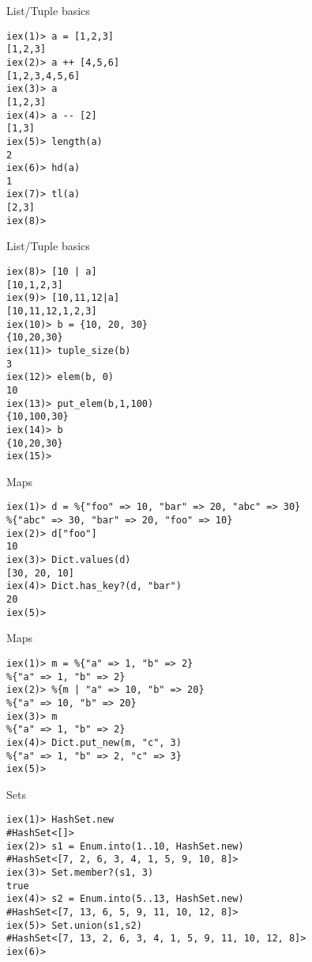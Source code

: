 \documentclass{beamer}
\begin{document}
\begin{frame}[fragile]{List/Tuple basics}

\begin{verbatim}
iex(1)> a = [1,2,3]
[1,2,3]
iex(2)> a ++ [4,5,6]
[1,2,3,4,5,6]
iex(3)> a
[1,2,3]
iex(4)> a -- [2]
[1,3]
iex(5)> length(a)
2
iex(6)> hd(a)
1
iex(7)> tl(a)
[2,3]
iex(8)>
\end{verbatim} 
\end{frame}

\begin{frame}[fragile]{List/Tuple basics}

\begin{verbatim}
iex(8)> [10 | a]
[10,1,2,3]
iex(9)> [10,11,12|a]
[10,11,12,1,2,3]
iex(10)> b = {10, 20, 30} 
{10,20,30}
iex(11)> tuple_size(b)
3
iex(12)> elem(b, 0)
10
iex(13)> put_elem(b,1,100)
{10,100,30}
iex(14)> b
{10,20,30}
iex(15)> 

\end{verbatim}
\end{frame}

\begin{frame}[fragile]{Maps}

\begin{verbatim}
iex(1)> d = %{"foo" => 10, "bar" => 20, "abc" => 30}
%{"abc" => 30, "bar" => 20, "foo" => 10}
iex(2)> d["foo"]
10
iex(3)> Dict.values(d)
[30, 20, 10]
iex(4)> Dict.has_key?(d, "bar")
20
iex(5)> 

\end{verbatim}
\end{frame}
\begin{frame}[fragile]{Maps}

\begin{verbatim}
iex(1)> m = %{"a" => 1, "b" => 2}
%{"a" => 1, "b" => 2}
iex(2)> %{m | "a" => 10, "b" => 20}
%{"a" => 10, "b" => 20}
iex(3)> m
%{"a" => 1, "b" => 2}
iex(4)> Dict.put_new(m, "c", 3)
%{"a" => 1, "b" => 2, "c" => 3}
iex(5)>

\end{verbatim}
\end{frame}
\begin{frame}[fragile]{Sets}

\begin{verbatim}
iex(1)> HashSet.new
#HashSet<[]>
iex(2)> s1 = Enum.into(1..10, HashSet.new)
#HashSet<[7, 2, 6, 3, 4, 1, 5, 9, 10, 8]>
iex(3)> Set.member?(s1, 3)
true
iex(4)> s2 = Enum.into(5..13, HashSet.new)
#HashSet<[7, 13, 6, 5, 9, 11, 10, 12, 8]>
iex(5)> Set.union(s1,s2)
#HashSet<[7, 13, 2, 6, 3, 4, 1, 5, 9, 11, 10, 12, 8]>
iex(6)> 
\end{verbatim}
\end{frame}
\end{document}
